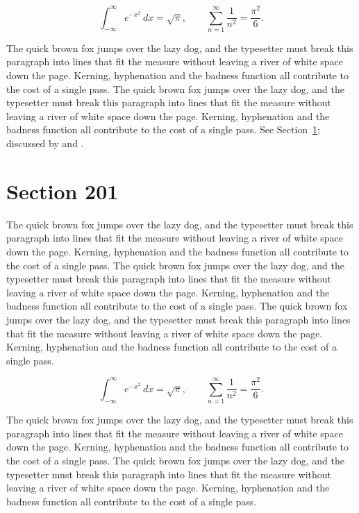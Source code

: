 \documentclass{article}
\begin{document}
\begin{equation}\label{eq:200}
\int_{-\infty}^{\infty} e^{-x^{2}}\,dx = \sqrt{\pi}, \qquad
\sum_{n=1}^{\infty} \frac{1}{n^{2}} = \frac{\pi^{2}}{6}.
\end{equation}

The quick brown fox jumps over the lazy dog, and the typesetter must break this paragraph into lines that fit the measure without leaving a river of white space down the page. Kerning, hyphenation and the badness function all contribute to the cost of a single pass. The quick brown fox jumps over the lazy dog, and the typesetter must break this paragraph into lines that fit the measure without leaving a river of white space down the page. Kerning, hyphenation and the badness function all contribute to the cost of a single pass. 
See Section~\ref{sec:201}; discussed by \textcite{k1} and \textcite{l3}.
\section{Section 201}
\label{sec:201}
The quick brown fox jumps over the lazy dog, and the typesetter must break this paragraph into lines that fit the measure without leaving a river of white space down the page. Kerning, hyphenation and the badness function all contribute to the cost of a single pass. The quick brown fox jumps over the lazy dog, and the typesetter must break this paragraph into lines that fit the measure without leaving a river of white space down the page. Kerning, hyphenation and the badness function all contribute to the cost of a single pass. The quick brown fox jumps over the lazy dog, and the typesetter must break this paragraph into lines that fit the measure without leaving a river of white space down the page. Kerning, hyphenation and the badness function all contribute to the cost of a single pass. 

\begin{equation}\label{eq:201}
\int_{-\infty}^{\infty} e^{-x^{2}}\,dx = \sqrt{\pi}, \qquad
\sum_{n=1}^{\infty} \frac{1}{n^{2}} = \frac{\pi^{2}}{6}.
\end{equation}

The quick brown fox jumps over the lazy dog, and the typesetter must break this paragraph into lines that fit the measure without leaving a river of white space down the page. Kerning, hyphenation and the badness function all contribute to the cost of a single pass. The quick brown fox jumps over the lazy dog, and the typesetter must break this paragraph into lines that fit the measure without leaving a river of white space down the page. Kerning, hyphenation and the badness function all contribute to the cost of a single pass. 
\end{document}
